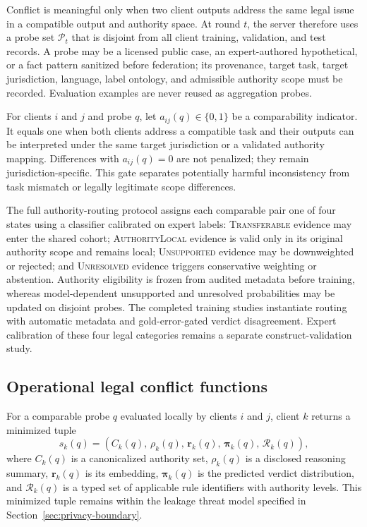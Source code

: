 \documentclass[a4paper,fleqn]{cas-sc}
\newcommand{\rules}{\mathcal{R}}
\begin{document}
Conflict is meaningful only when two client outputs address the same legal issue in a compatible output and authority space. At round $t$, the server therefore uses a probe set $\mathcal{P}_t$ that is disjoint from all client training, validation, and test records. A probe may be a licensed public case, an expert-authored hypothetical, or a fact pattern sanitized before federation; its provenance, target task, target jurisdiction, language, label ontology, and admissible authority scope must be recorded. Evaluation examples are never reused as aggregation probes.

For clients $i$ and $j$ and probe $q$, let $a_{ij}(q)\in\{0,1\}$ be a comparability indicator. It equals one when both clients address a compatible task and their outputs can be interpreted under the same target jurisdiction or a validated authority mapping. Differences with $a_{ij}(q)=0$ are not penalized; they remain jurisdiction-specific. This gate separates potentially harmful inconsistency from task mismatch or legally legitimate scope differences.

The full authority-routing protocol assigns each comparable pair one of four states using a classifier calibrated on expert labels: \textsc{Transferable} evidence may enter the shared cohort; \textsc{AuthorityLocal} evidence is valid only in its original authority scope and remains local; \textsc{Unsupported} evidence may be downweighted or rejected; and \textsc{Unresolved} evidence triggers conservative weighting or abstention. Authority eligibility is frozen from audited metadata before training, whereas model-dependent unsupported and unresolved probabilities may be updated on disjoint probes. The completed training studies instantiate routing with automatic metadata and gold-error-gated verdict disagreement. Expert calibration of these four legal categories remains a separate construct-validation study.

\subsection{Operational legal conflict functions}

For a comparable probe $q$ evaluated locally by clients $i$ and $j$, client $k$ returns a minimized tuple
\begin{equation}
    s_k(q) = \left(C_k(q),\, \rho_k(q),\, \bm{r}_k(q),\, \bm{\pi}_k(q),\, \rules_k(q)\right),
\end{equation}
where $C_k(q)$ is a canonicalized authority set, $\rho_k(q)$ is a disclosed reasoning summary, $\bm{r}_k(q)$ is its embedding, $\bm{\pi}_k(q)$ is the predicted verdict distribution, and $\rules_k(q)$ is a typed set of applicable rule identifiers with authority levels. This minimized tuple remains within the leakage threat model specified in Section~\ref{sec:privacy-boundary}.
\end{document}
